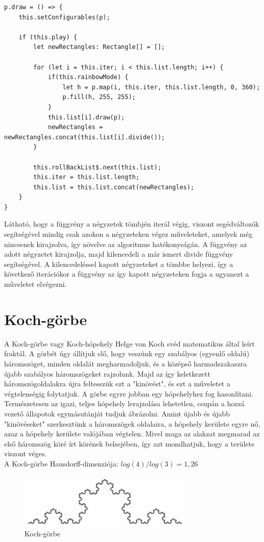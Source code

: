 \begin{lstlisting}
p.draw = () => {
	this.setConfigurables(p);

	if (this.play) {
		let newRectangles: Rectangle[] = [];
		
		for (let i = this.iter; i < this.list.length; i++) {
			if(this.rainbowMode) {
				let h = p.map(i, this.iter, this.list.length, 0, 360);
				p.fill(h, 255, 255);
			}
			this.list[i].draw(p);
			newRectangles = newRectangles.concat(this.list[i].divide());
		}
		
		this.rollBackList$.next(this.list);
		this.iter = this.list.length;
		this.list = this.list.concat(newRectangles);
	}
}
\end{lstlisting}
Látható, hogy a függvény a négyzetek tömbjén iterál végig, viszont segédváltozók segítségével mindig csak azokon a négyzeteken végez műveleteket, amelyek még nincsenek kirajzolva, így növelve az algoritmus hatékonyságán. A függvény az adott négyzetet kirajzolja, majd kilencedeli a már ismert divide függvény segítségével. A kilencedeléssel kapott négyzeteket a tömbbe helyezi, így a következő iterációkor a függvény az így kapott négyzeteken fogja a ugyanezt a műveletet elvégezni.
\section*{Koch-görbe}
A Koch-görbe vagy Koch-hópehely Helge von Koch svéd matematikus által leírt fraktál. A görbét úgy állítjuk elő, hogy veszünk egy szabályos (egyenlő oldalú) háromszöget, minden oldalát megharmadoljuk, és a középső harmadszakaszra újabb szabályos háromszögeket rajzolunk. Majd az így keletkezett háromszögoldalakra újra feltesszük ezt a "kinövést", és ezt a műveletet a végtelenségig folytatjuk. A görbe egyre jobban egy hópehelyhez fog hasonlítani. Természetesen az igazi, teljes hópehely lerajzolása lehetetlen, csupán a hozzá vezető állapotok egymásutánját tudjuk ábrázolni. Amint újabb és újabb "kinövéseket" szerkesztünk a háromszögek oldalaira, a hópehely kerülete egyre nő, azaz a hópehely kerülete valójában végtelen. Mivel maga az alakzat megmarad az első háromszög köré írt körének belsejében, így azt mondhatjuk, hogy a területe viszont véges.\\
A Koch-görbe Hausdorff-dimenziója: $log(4)/log(3) = 1,26$
\begin{figure}[!ht]
	\begin{center}
		\includegraphics[width=0.75\textwidth]{img/KochCurve}
		\caption[labelInTOC]{Koch-görbe}
	\end{center}
\end{figure}

